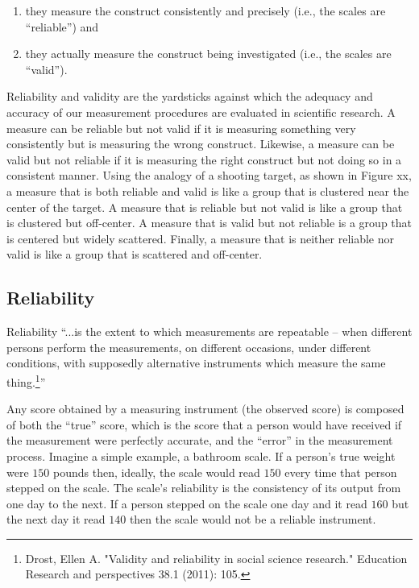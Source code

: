 \begin{enumerate}
	\item they measure the construct consistently and precisely (i.e., the scales are ``reliable'') and 

	\item they actually measure the construct being investigated (i.e., the scales are ``valid''). 
\end{enumerate}

Reliability and validity are the yardsticks against which the adequacy and accuracy of our measurement procedures are evaluated in scientific research.
A measure can be reliable but not valid if it is measuring something very consistently but is measuring the wrong construct. Likewise, a measure can be valid but not reliable if it is measuring the right construct but not doing so in a consistent manner. Using the analogy of a shooting target, as shown in Figure xx, a measure that is both reliable and valid is like a group that is clustered near the center of the target. A measure that is reliable but not valid is like a group that is clustered but off-center. A measure that is valid but not reliable is a group that is centered but widely scattered. Finally, a measure that is neither reliable nor valid is like a group that is scattered and off-center. 

\subsection{Reliability}

Reliability ``...is the extent to which measurements are repeatable – when different persons perform the measurements, on different occasions, under different conditions, with supposedly alternative instruments which measure the same thing.\footnote{Drost, Ellen A. "Validity and reliability in social science research." Education Research and perspectives 38.1 (2011): 105.}''

Any score obtained by a measuring instrument (the observed score) is composed of both the ``true'' score, which is the score that a person would have received if the measurement were perfectly accurate, and the ``error'' in the measurement process. Imagine a simple example, a bathroom scale. If a person's true weight were $ 150 $ pounds then, ideally, the scale would read $ 150 $ every time that person stepped on the scale. The scale's reliability is the consistency of its output from one day to the next. If a person stepped on the scale one day and it read $ 160 $ but the next day it read $ 140 $ then the scale would not be a reliable instrument.

